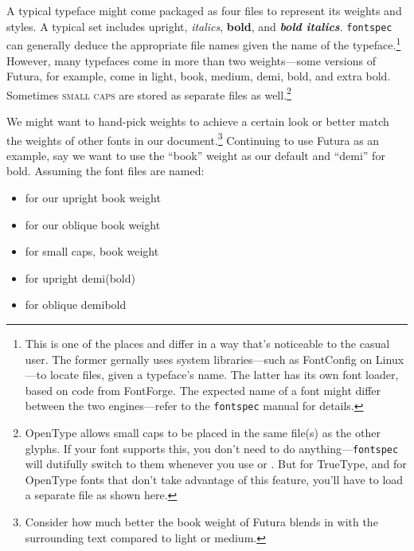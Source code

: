 A typical typeface might come packaged as four files to represent its
weights and styles.
A typical set includes upright,
\textit{italics},
\textbf{bold}, and
\textit{\textbf{bold italics}}.
\texttt{fontspec} can generally deduce the appropriate file
names given the name of the typeface.\punckern\footnote{This is
one of the places \XeLaTeX{} and \LuaLaTeX{}
differ in a way that's noticeable to the casual user.
The former gernally uses system libraries---such as FontConfig on Linux---to
locate files, given a typeface's name.
The latter has its own font loader,
based on code from FontForge.\punckern{}
The expected name of a font might differ between the two engines---refer
to the \texttt{fontspec} manual for details.}
However, many typefaces come in more than two weights---some versions of Futura,
for example, come in
{light},
{book},
{medium},
{demi},
{bold}, and
{extra bold}.
Sometimes
{\textsc{small caps}}
are stored as separate files as well.\punckern\footnote{OpenType allows
small caps to be placed in the same file(s) as the other glyphs.
If your font supports this, you don't need to do anything---\texttt{fontspec}
will dutifully switch to them whenever you use
 or .
But for TrueType, and for OpenType fonts that don't take advantage of this
feature, you'll have to load a separate file as shown here.}

We might want to hand-pick weights to achieve a certain look or better match the
weights of other fonts in our document.\punckern\footnote{Consider how much
better {the book weight} of Futura
blends in with the surrounding text compared to
{light}
or
{medium}.}
Continuing to use Futura as an example,
say we want to use the ``book'' weight as our default
and ``demi'' for bold.
Assuming the font files are named:
\begin{itemize}
\item {} for our
    {upright book weight}
\item {} for our
    {oblique book weight}
\item {} for
    {small caps, book weight}
\item {} for
    {upright demi(bold)}
\item {} for
    {oblique demibold}
\end{itemize}


